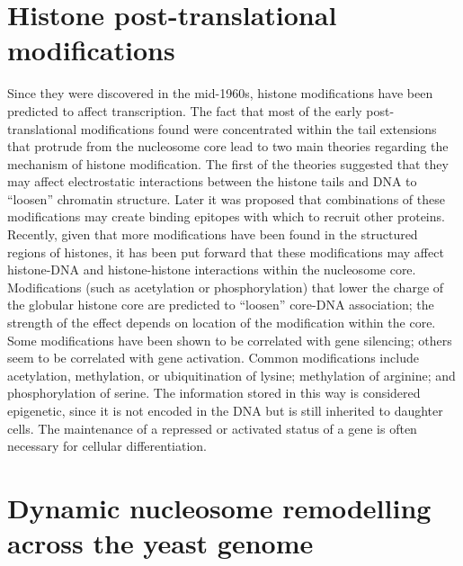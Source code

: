 \hypertarget{histone-post-translational-modifications}{%
\section{Histone post-translational modifications}\label{histone-post-translational-modifications}}

Since they were discovered in the mid-1960s, histone modifications have been predicted to affect transcription. The fact that most of the early post-translational modifications found were concentrated within the tail extensions that protrude from the nucleosome core lead to two main theories regarding the mechanism of histone modification. The first of the theories suggested that they may affect electrostatic interactions between the histone tails and DNA to ``loosen'' chromatin structure. Later it was proposed that combinations of these modifications may create binding epitopes with which to recruit other proteins. Recently, given that more modifications have been found in the structured regions of histones, it has been put forward that these modifications may affect histone-DNA and histone-histone interactions within the nucleosome core. Modifications (such as acetylation or phosphorylation) that lower the charge of the globular histone core are predicted to ``loosen'' core-DNA association; the strength of the effect depends on location of the modification within the core. Some modifications have been shown to be correlated with gene silencing; others seem to be correlated with gene activation. Common modifications include acetylation, methylation, or ubiquitination of lysine; methylation of arginine; and phosphorylation of serine. The information stored in this way is considered epigenetic, since it is not encoded in the DNA but is still inherited to daughter cells. The maintenance of a repressed or activated status of a gene is often necessary for cellular differentiation.

\hypertarget{dynamic-nucleosome-remodelling-across-the-yeast-genome}{%
\section{Dynamic nucleosome remodelling across the yeast genome}\label{dynamic-nucleosome-remodelling-across-the-yeast-genome}}

